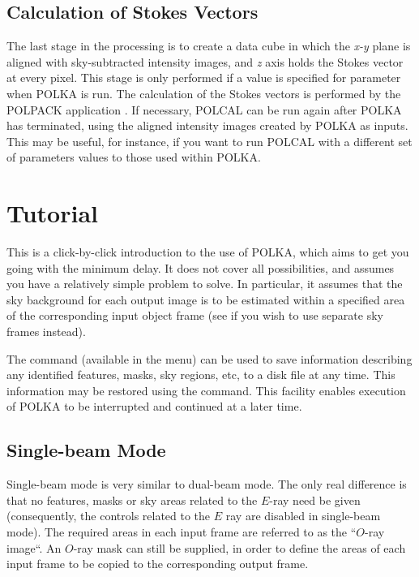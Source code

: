 \documentclass[11pt,nolof]{starlink}
\providecommand{\mylabel}[1] {\xlabel{#1}\label{#1}}
\begin{document}
\subsection{\mylabel{POLKA_STOCAL}Calculation of Stokes Vectors}
The last stage in the processing is to create a data cube in which the
\emph{x-y} plane is aligned with sky-subtracted intensity images, and
\emph{z} axis holds the Stokes vector at every pixel. This stage is only
performed if a value is specified for parameter 
when POLKA is run. The calculation of the Stokes vectors is performed by
the POLPACK application . If necessary,
POLCAL can be run again after POLKA has terminated, using the aligned
intensity images created by POLKA as inputs. This may be useful, for
instance, if you want to run POLCAL with a different set of parameters
values to those used within POLKA.

\section {\mylabel{POLKA_TUTORIAL}Tutorial}
This is a click-by-click introduction to the use of POLKA, which aims to
get you going with the minimum delay. It does not cover all possibilities,
and assumes you have a relatively simple problem to solve. In particular,
it assumes that the sky background for each output image is to be
estimated within a specified area of the corresponding input object frame
(see  if you wish to use
separate sky frames instead).

The  command (available in the
 menu) can be used to save
information describing any identified features, masks, sky regions, etc,
to a disk file at any time. This information may be restored using the
 command. This facility enables
execution of POLKA to be interrupted and continued at a later time.

\subsection {\mylabel{POLKA_SBEAM_TUT}Single-beam Mode}
Single-beam mode is very similar to dual-beam mode. The only real
difference is that no features, masks or sky areas related to the $E$-ray
need be given (consequently, the controls related to the $E$ ray are
disabled in single-beam mode). The required areas in each input frame are
referred to as the ``$O$-ray image``. An $O$-ray mask can still be
supplied, in order to define the areas of each input frame to be copied
to the corresponding output frame.
\end{document}
